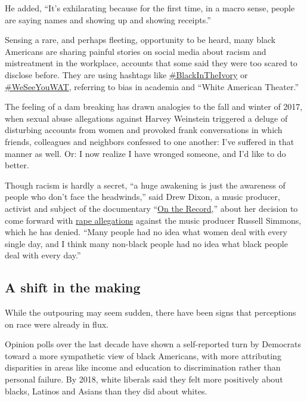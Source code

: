 He added, ``It's exhilarating because for the first time, in a macro
sense, people are saying names and showing up and showing receipts.''

Sensing a rare, and perhaps fleeting, opportunity to be heard, many
black Americans are sharing painful stories on social media about racism
and mistreatment in the workplace, accounts that some said they were too
scared to disclose before. They are using hashtags like
\href{https://twitter.com/search?q=\%23BlackintheIvory\&src=typeahead_click}{\#BlackInTheIvory}
or
\href{https://twitter.com/search?q=\%23WeSeeYouwat\&src=typeahead_click}{\#WeSeeYouWAT},
referring to bias in academia and ``White American Theater.''

The feeling of a dam breaking has drawn analogies to the fall and winter
of 2017, when sexual abuse allegations against Harvey Weinstein
triggered a deluge of disturbing accounts from women and provoked frank
conversations in which friends, colleagues and neighbors confessed to
one another: I've suffered in that manner as well. Or: I now realize I
have wronged someone, and I'd like to do better.

Though racism is hardly a secret, ``a huge awakening is just the
awareness of people who don't face the headwinds,'' said Drew Dixon, a
music producer, activist and subject of the documentary
``\href{https://www.nytimes.com/2020/05/27/movies/on-the-record-russell-simmons-review.html}{On
the Record},'' about her decision to come forward with
\href{https://www.nytimes.com/2017/12/13/arts/music/russell-simmons-rape.html}{rape
allegations} against the music producer Russell Simmons, which he has
denied. ``Many people had no idea what women deal with every single day,
and I think many non-black people had no idea what black people deal
with every day.''

\hypertarget{a-shift-in-the-making}{%
\subsection{A shift in the making}\label{a-shift-in-the-making}}

While the outpouring may seem sudden, there have been signs that
perceptions on race were already in flux.

Opinion polls over the last decade have shown a self-reported turn by
Democrats toward a more sympathetic view of black Americans, with more
attributing disparities in areas like income and education to
discrimination rather than personal failure. By 2018, white liberals
said they felt more positively about blacks, Latinos and Asians than
they did about whites.


